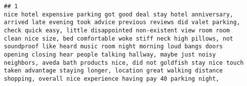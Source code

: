 \documentclass[
]{article}
\begin{document}
\begin{verbatim}
## 1                                                                                                                                                                                                                                                                                                                                                                                                                                                                                                                                                                                                                                                                                                                                                                                                                                                                                                                                                                                                                                                                                                                                         nice hotel expensive parking got good deal stay hotel anniversary, arrived late evening took advice previous reviews did valet parking, check quick easy, little disappointed non-existent view room room clean nice size, bed comfortable woke stiff neck high pillows, not soundproof like heard music room night morning loud bangs doors opening closing hear people talking hallway, maybe just noisy neighbors, aveda bath products nice, did not goldfish stay nice touch taken advantage staying longer, location great walking distance shopping, overall nice experience having pay 40 parking night,  

\end{verbatim}
\end{document}
